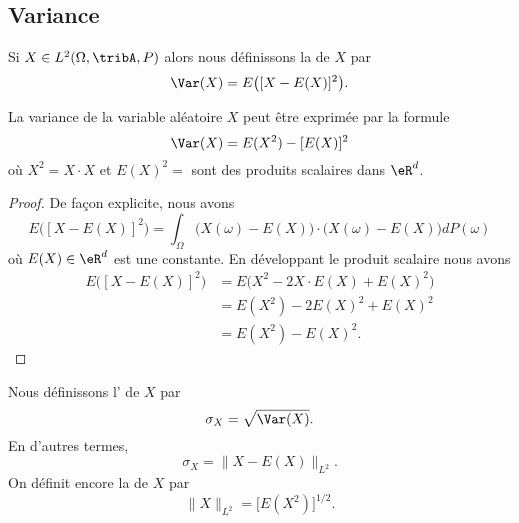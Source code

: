 \subsection{Variance}

Si \( X\in L^2(\Omega,\tribA,P)\) alors nous définissons la  de \( X\) par
\begin{equation}
    \Var(X)=E\big( [X-E(X)]^2 \big).
\end{equation}

\begin{proposition}     \label{PrropVarAlterfrom}
    La variance de la variable aléatoire \( X\) peut être exprimée par la formule
    \begin{equation}        \label{EqtWqMGB}
        \Var(X)=E(X^2)-[E(X)]^2
    \end{equation}
    où \( X^2=X\cdot X\) et \( E(X)^2=\) sont des produits scalaires dans \( \eR^d\).
\end{proposition}

\begin{proof}
    De façon explicite, nous avons
    \begin{equation}
        E\big( [X-E(X)]^2 \big)=\int_{\Omega}\big( X(\omega)-E(X) \big)\cdot\big( X(\omega)-E(X) \big)dP(\omega)
    \end{equation}
    où \( E(X)\in\eR^d\) est une constante. En développant le produit scalaire nous avons
    \begin{subequations}
        \begin{align}
            E\big( [X-E(X)]^2 \big)&=E\big( X^2-2X\cdot E(X)+E(X)^2 \big)\\
            &=E(X^2)-2E(X)^2+E(X)^2\\
            &=E(X^2)-E(X)^2.
        \end{align}
    \end{subequations}
\end{proof}


Nous définissons l' de \( X\) par
\begin{equation}
    \sigma_X=\sqrt{\Var(X)}.
\end{equation}
En d'autres termes,
\begin{equation}
    \sigma_X=\| X-E(X) \|_{L^2}.
\end{equation}
On définit encore la  de \( X\) par
\begin{equation}
    \| X \|_{L^2}=\big[ E(X^2) \big]^{1/2}.
\end{equation}


